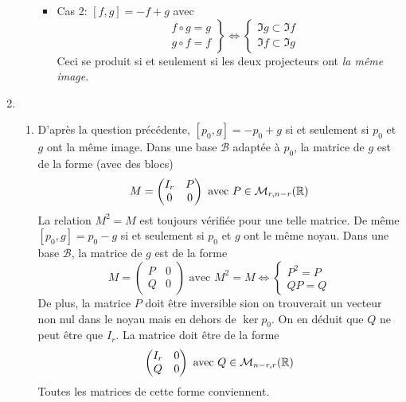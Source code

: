 \begin{enumerate}
\begin{enumerate}
\begin{itemize}
  \item Cas 2: $[f,g]= -f + g$ avec 
\begin{displaymath}
\left. 
\begin{aligned}
  &f\circ g = g \\ &g\circ f = f
\end{aligned}
\right\rbrace 
\Leftrightarrow
\left\lbrace 
\begin{aligned}
  \Im g \subset \Im f \\ \Im f \subset \Im g 
\end{aligned}
\right. 
\end{displaymath}
Ceci se produit si et seulement si les deux projecteurs ont \emph{la même image}.  
\end{itemize}
\end{enumerate}
\item 
\begin{enumerate}
  \item D'après la question précédente, $[p_0, g]=-p_0 + g$ si et seulement si $p_0$ et $g$ ont la même image. Dans une base $\mathcal{B}$ adaptée à $p_0$, la matrice de $g$ est de la forme (avec des blocs)
\begin{displaymath}
M = 
\begin{pmatrix}
  I_r & P \\ 0 & 0 
\end{pmatrix}
\text{ avec } P\in \mathcal{M}_{r,n-r}(\mathbb{R})  
\end{displaymath}
La relation $M^2 = M$ est toujours vérifiée pour une telle matrice.\newline
De même $[p_0, g] = p_0 - g$ si et seulement si $p_0$ et $g$ ont le même noyau. Dans une base $\mathcal{B}$, la matrice de $g$ est de la forme
\begin{displaymath}
M = 
\begin{pmatrix}
  P & 0 \\ Q & 0 
\end{pmatrix}
\text{ avec } M^2 = M \Leftrightarrow
\left\lbrace 
\begin{aligned}
  P^2 = P \\ QP =Q
\end{aligned}
\right. 
\end{displaymath}
De plus, la matrice $P$ doit être inversible sion on trouverait un vecteur non nul dans le noyau mais en dehors de $\ker p_0$. On en déduit que $Q$ ne peut être que $I_r$. La matrice doit être de la forme
\begin{displaymath}
\begin{pmatrix}
  I_r & 0 \\ Q & 0
\end{pmatrix}
\text{ avec } Q\in \mathcal{M}_{n-r,r}(\mathbb{R})
\end{displaymath}
Toutes les matrices de cette forme conviennent.
\end{enumerate}

\end{enumerate}
